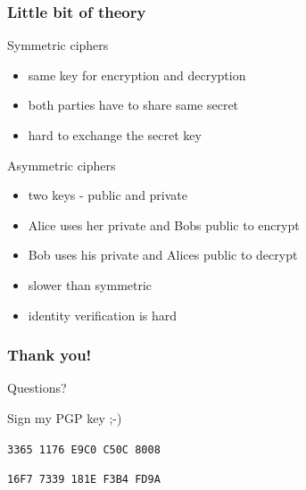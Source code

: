 \documentclass[xcolor={usenames,dvipsnames,svgnames}]{beamer}
\begin{document}
\begin{frame}[t]
   \frametitle{Little bit of theory}
   {\Large Symmetric ciphers}
   \begin{itemize}
	\item same key for encryption and decryption
	\item both parties have to share same secret
	\item hard to exchange the secret key
   \end{itemize}
   \vspace{.5cm}
   {\Large Asymmetric ciphers}
   \begin{itemize}
	\item two keys - public and private
	\item Alice uses her private and Bobs public to encrypt
	\item Bob uses his private and Alices public to decrypt
	\item slower than symmetric
	\item identity verification is hard
   \end{itemize}
\end{frame}








\begin{frame}[t,fragile]
   \frametitle{Thank you!}
\begin{center}
\Large
   Questions?

\vspace{1cm}
Sign my PGP key ;-)

\vspace{.5cm}
\verb|3365 1176 E9C0 C50C 8008|

\verb|16F7 7339 181E F3B4 FD9A|
\end{center}
\end{frame}
\end{document}
